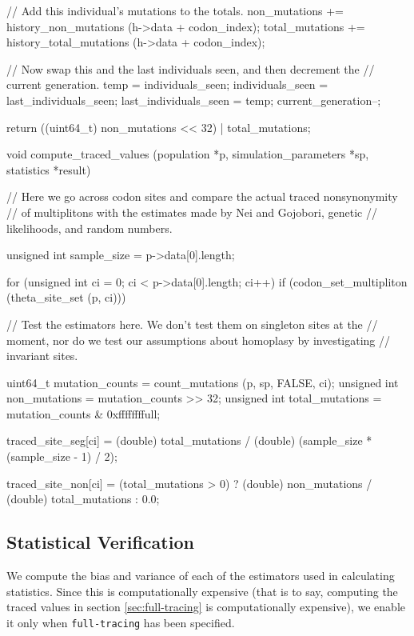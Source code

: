 \documentclass{article}
\begin{document}
\begin{ccode}
{{{        // Add this individual's mutations to the totals.
        non_mutations += history_non_mutations (h->data + codon_index);
        total_mutations += history_total_mutations (h->data + codon_index);
      }

    // Now swap this and the last individuals seen, and then decrement the
    // current generation.
    temp = individuals_seen;
    individuals_seen = last_individuals_seen;
    last_individuals_seen = temp;
    current_generation--;
  }

  return ((uint64_t) non_mutations << 32) | total_mutations;
}

void compute_traced_values (population *p, simulation_parameters *sp, statistics *result) {
  // Here we go across codon sites and compare the actual traced nonsynonymity
  // of multiplitons with the estimates made by Nei and Gojobori, genetic
  // likelihoods, and random numbers.

  unsigned int sample_size = p->data[0].length;

  for (unsigned int ci = 0; ci < p->data[0].length; ci++)
    if (codon_set_multipliton (theta_site_set (p, ci))) {
      // Test the estimators here. We don't test them on singleton sites at the
      // moment, nor do we test our assumptions about homoplasy by investigating
      // invariant sites.

      uint64_t		mutation_counts = count_mutations (p, sp, FALSE, ci);
      unsigned int	non_mutations   = mutation_counts >> 32;
      unsigned int	total_mutations = mutation_counts & 0xffffffffull;

      traced_site_seg[ci] = (double) total_mutations /
			    (double) (sample_size * (sample_size - 1) / 2);

      traced_site_non[ci] = (total_mutations > 0) ?
			      (double) non_mutations / (double) total_mutations :
			      0.0;
    }
}
\end{ccode}

    \subsection{Statistical Verification}
      \label{sec:statistical-verification}

      We compute the bias and variance of each of the estimators used in
      calculating statistics. Since this is computationally expensive (that is
      to say, computing the traced values in section \ref{sec:full-tracing} is
      computationally expensive), we enable it only when \verb|full-tracing| has
      been specified.
\end{document}
